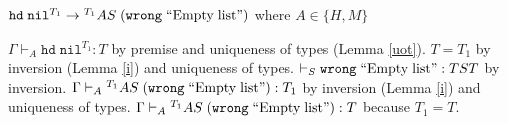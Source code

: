\begin{case}
$\mathtt{hd}\;\mathtt{nil}^{T_{1}}\rightarrow{^{T_{1}}A}S\;(\mathtt{wrong}\;\mathrm{``Empty\;list"})$ where $A\in\lbrace H,M\rbrace$

$\Gamma\vdash_{A}\mathtt{hd}\;\mathtt{nil}^{T_{1}}:T$ by premise and uniqueness of types (Lemma \ref{uot}).  $T=T_{1}$ by inversion (Lemma \ref{i}) and uniqueness of types.  $\vdash_{S}\mathtt{wrong}\;\mathrm{``Empty\;list"}:TST$ by inversion.  $\Gamma\vdash_{A}{^{T_{1}}A}S\;(\mathtt{wrong}\;\mathrm{``Empty\;list"}):T_{1}$ by inversion (Lemma \ref{i}) and uniqueness of types.  $\Gamma\vdash_{A}{^{T_{1}}A}S\;(\mathtt{wrong}\;\mathrm{``Empty\;list"}):T$ because $T_{1}=T$.
\end{case}